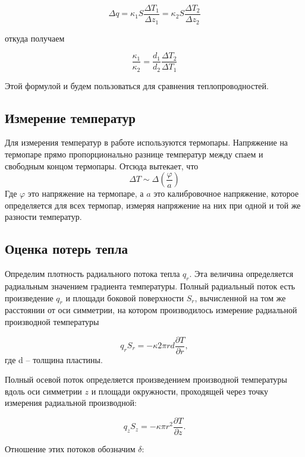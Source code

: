 \documentclass[a4paper, 12pt]{article}
\begin{document}
    \[\Delta q = \kappa_1 S \frac{\Delta T_1}{\Delta z_1} = \kappa_2 S \frac{\Delta T_2}{\Delta z_2}\]

    откуда получаем

    \begin{equation}
        \frac{\kappa_1}{\kappa_2} = \frac{d_1}{d_2}\frac{\Delta T_2}{\Delta T_1}
    \end{equation}

    Этой формулой и будем пользоваться для сравнения теплопроводностей.

    \subsection{Измерение температур}
    Для измерения температур в работе используются термопары. Напряжение на термопаре
    прямо пропорционально разнице температур между спаем и свободным концом термопары.
    Отсюда вытекает, что
    \[\Delta T \sim \Delta \left(\frac{\varphi}{a}\right)\]
    Где $\varphi$ это напряжение на термопаре, а $a$ это калибровочное напряжение, которое определяется для всех термопар, измеряя напряжение на них при одной и той же разности температур.

    \subsection{Оценка потерь тепла}
    Определим плотность радиального потока тепла $ q_r $. Эта величина определяется радиальным значением градиента температуры. Полный радиальный поток есть произведение $ q_r $ и площади боковой поверхности $ S_r $, вычисленной на том же расстоянии от оси симметрии, на котором производилось измерение радиальной производной температуры

    \begin{equation}\label{poteri1}
    q_r S_r = - \kappa 2 \pi rd \frac{\partial T}{\partial r},
    \end{equation}
    где d -- толщина пластины.

    Полный осевой поток определяется произведением производной температуры вдоль оси симметрии $ z $ и площади окружности, проходящей через точку измерения радиальной производной:

    \begin{equation}\label{poteri2}
    q_z S_z = - \kappa \pi r^2 \frac{\partial T}{\partial z}.
    \end{equation}

    Отношение этих потоков обозначим $ \delta $:
\end{document}
